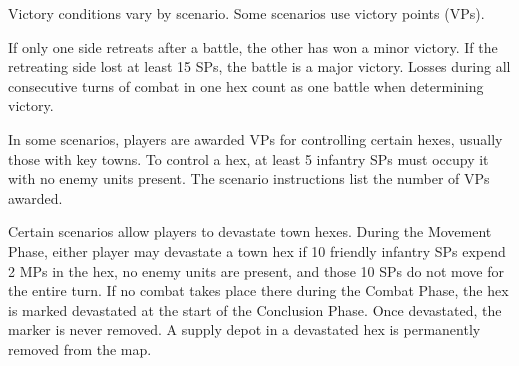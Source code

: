 
Victory conditions vary by scenario. Some scenarios use victory points (VPs).


If only one side retreats after a battle, the other has won a minor victory. If the retreating side lost at least 15 SPs, the battle is a major victory. Losses during all consecutive turns of combat in one hex count as one battle when determining victory.


In some scenarios, players are awarded VPs for controlling certain hexes, usually those with key towns. To control a hex, at least 5 infantry SPs must occupy it with no enemy units present. The scenario instructions list the number of VPs awarded.


Certain scenarios allow players to devastate town hexes. During the Movement Phase, either player may devastate a town hex if 10 friendly infantry SPs expend 2 MPs in the hex, no enemy units are present, and those 10 SPs do not move for the entire turn. If no combat takes place there during the Combat Phase, the hex is marked devastated at the start of the Conclusion Phase. Once devastated, the marker is never removed. A supply depot in a devastated hex is permanently removed from the map.
